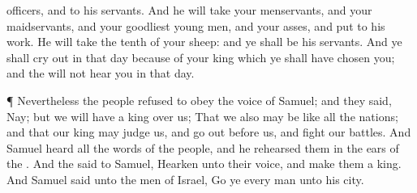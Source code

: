 {officers, and to his
servants.
And he will
take your
menservants, and your
maidservants, and your
goodliest young
men, and your
asses, and
put
{} to his
work.
He will take the
tenth of your
sheep: and ye shall be his
servants.
And ye shall cry
out in that
day
because of your
king which ye shall have
chosen you; and the
{} will not
hear you in that
day.
\par }{\PP {}¶ Nevertheless the
people
refused to
obey the
voice of
Samuel; and they
said, Nay; but we will have a
king over us;
That we also may be like all the
nations; and that our
king may
judge us, and go
out
before us, and
fight our
battles.
And
Samuel
heard all the
words of the
people, and he
rehearsed them in the
ears of the
{}.
And the
{}
said to
Samuel,
Hearken unto their
voice, and
make them a
king. And
Samuel
said unto the
men of
Israel,
Go ye every
man unto his
city.

}
